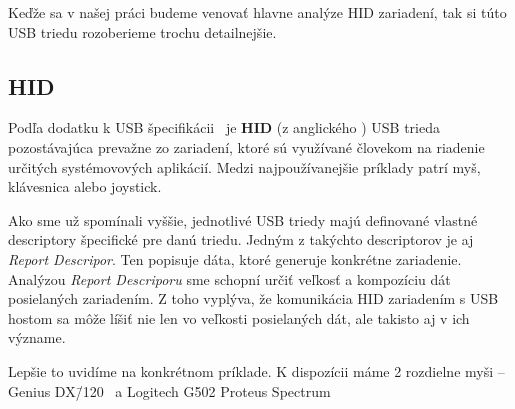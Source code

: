 Keďže sa v našej práci budeme venovať hlavne analýze HID zariadení, tak si túto USB triedu rozoberieme trochu detailnejšie.

\subsection*{HID}

Podľa dodatku k USB špecifikácii~\cite{usbhid} je \textbf{HID} (z anglického ) USB trieda pozostávajúca prevažne zo zariadení, ktoré sú využívané človekom na riadenie určitých systémovových aplikácií. Medzi najpoužívanejšie príklady patrí myš, klávesnica alebo joystick.

Ako sme už spomínali vyššie, jednotlivé USB triedy majú definované vlastné descriptory špecifické pre danú triedu. Jedným z takýchto descriptorov je aj \textit{Report Descripor}. Ten popisuje dáta, ktoré generuje konkrétne zariadenie. Analýzou \textit{Report Descriporu} sme schopní určiť veľkosť a kompozíciu dát posielaných zariadením. Z toho vyplýva, že komunikácia HID zariadením s USB hostom sa môže líšiť nie len vo veľkosti posielaných dát, ale takisto aj v ich význame.

Lepšie to uvidíme na konkrétnom príklade. K dispozícii máme 2 rozdielne myši -- Genius DX\=/120~\cite{genius_mouse} a Logitech G502 Proteus Spectrum~\cite{logitech_mouse}

